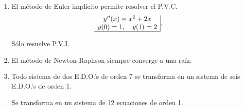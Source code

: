 \documentclass[11pt]{article}
\begin{document}
\begin{enumerate}
\begin{enumerate}
\begin{minipage}{0.4\textwidth}
    \end{minipage}
%
\item
{} 
    \begin{minipage}{0.4\textwidth}
	El método de Euler impl\'icito permite resolver el P.V.C.
    $$
    \begin{array}{c|}
    y''(x)=x^2+2x\\
    y(0)=1,\quad y(1)=2\\ \hline
    \end{array}.
    $$
    \end{minipage} 
    \begin{minipage}{0.4\textwidth}
    S\'olo resuelve P.V.I.
    
    \end{minipage}
\item
{} 
    \begin{minipage}{0.4\textwidth}
    El m\'etodo de Newton-Raphson siempre converge a una ra\'iz.
    \end{minipage} 
    \begin{minipage}{0.4\textwidth}
    

    \end{minipage}
%
\item
{} 
    \begin{minipage}{0.4\textwidth}
    Todo sistema de dos E.D.O.'s de orden 7 se transforma en un sistema de seis E.D.O.'s de orden 1.
    \end{minipage} 
    \begin{minipage}{0.4\textwidth}
    Se transforma en un sistema de 12 ecuaciones de orden 1.
    
    \end{minipage}
\end{enumerate}


\end{enumerate}
\end{document}
